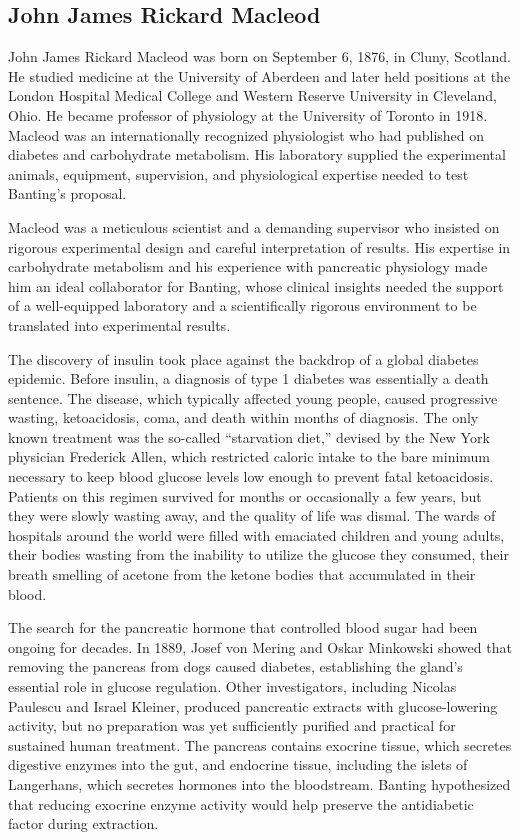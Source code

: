 \subsection{John James Rickard Macleod}

John James Rickard Macleod was born on September 6, 1876, in Cluny, Scotland. He studied medicine at the University of Aberdeen and later held positions at the London Hospital Medical College and Western Reserve University in Cleveland, Ohio. He became professor of physiology at the University of Toronto in 1918. Macleod was an internationally recognized physiologist who had published on diabetes and carbohydrate metabolism. His laboratory supplied the experimental animals, equipment, supervision, and physiological expertise needed to test Banting's proposal.\cite{macleod-facts}

Macleod was a meticulous scientist and a demanding supervisor who insisted on rigorous experimental design and careful interpretation of results. His expertise in carbohydrate metabolism and his experience with pancreatic physiology made him an ideal collaborator for Banting, whose clinical insights needed the support of a well-equipped laboratory and a scientifically rigorous environment to be translated into experimental results.

The discovery of insulin took place against the backdrop of a global diabetes epidemic. Before insulin, a diagnosis of type 1 diabetes was essentially a death sentence. The disease, which typically affected young people, caused progressive wasting, ketoacidosis, coma, and death within months of diagnosis. The only known treatment was the so-called ``starvation diet,'' devised by the New York physician Frederick Allen, which restricted caloric intake to the bare minimum necessary to keep blood glucose levels low enough to prevent fatal ketoacidosis. Patients on this regimen survived for months or occasionally a few years, but they were slowly wasting away, and the quality of life was dismal. The wards of hospitals around the world were filled with emaciated children and young adults, their bodies wasting from the inability to utilize the glucose they consumed, their breath smelling of acetone from the ketone bodies that accumulated in their blood.

The search for the pancreatic hormone that controlled blood sugar had been ongoing for decades. In 1889, Josef von Mering and Oskar Minkowski showed that removing the pancreas from dogs caused diabetes, establishing the gland's essential role in glucose regulation. Other investigators, including Nicolas Paulescu and Israel Kleiner, produced pancreatic extracts with glucose-lowering activity, but no preparation was yet sufficiently purified and practical for sustained human treatment. The pancreas contains exocrine tissue, which secretes digestive enzymes into the gut, and endocrine tissue, including the islets of Langerhans, which secretes hormones into the bloodstream. Banting hypothesized that reducing exocrine enzyme activity would help preserve the antidiabetic factor during extraction.\cite{macleod-lecture,banting-facts}

